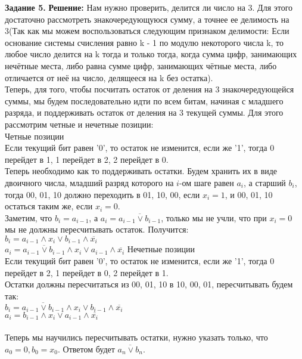 \documentclass[12pt,a4paper]{scrartcl}
\begin{document}
	\noindent
	\textbf{Задание 5.}
	\newline
	\textbf{Решение:}
	\newline
	\indent
	Нам нужно проверить, делится ли число на 3. Для этого достаточно рассмотреть знакочередующуюся сумму, а точнее ее делимость на 3(Так как мы можем воспользоваться следующим признаком делимости: Если основание системы счисления равно k - 1 по модулю некоторого числа k, то любое число делится на k тогда и только тогда, когда сумма цифр, занимающих нечётные места, либо равна сумме цифр, занимающих чётные места, либо отличается от неё на число, делящееся на k без остатка).\\
	Теперь, для того, чтобы посчитать остаток от деления на 3 знакочередующейся суммы, мы будем последовательно идти по всем битам, начиная с младшего разряда, и поддерживать остаток от деления на 3 текущей суммы. Для этого рассмотрим четные и нечетные позиции: \\
	\textbullet  Четные позиции \\
	\indent
		Если текущий бит равен '0', то остаток не изменится, если же '1', тогда 0 перейдет в 1, 1 перейдет в 2, 2 перейдет в 0. \\
		Теперь необходимо как то поддерживать остатки. Будем хранить их в виде двоичного числа, младший разряд которого на $i$-ом шаге равен $a_i$, а старший $b_i$, тогда 00, 01, 10 должно переходить в 01, 10, 00, если $x_i = 1$, и 00, 01, 10 остаться таким же, если $x_i = 0$.\\
		Заметим, что $b_i = a_{i - 1}$, а $a_i = \overline{a_{i - 1} \lor b_{i - 1}}$, только мы не учли, что при $x_i = 0$ мы не должны пересчитывать остаток. Получится:\\
		$b_i = a_{i - 1} \land x_i \lor b_{i - 1} \land \overline{x_i}$\\
		$a_i = \overline{a_{i - 1} \lor b_{i - 1}} \land x_i \lor a_{i - 1} \land \overline{x_i}$
	\newpage 
	\noindent
	\textbullet  Нечетные позиции \\
	\indent
	Если текущий бит равен '0', то остаток не изменится, если же '1', тогда 0 перейдет в 2, 1 перейдет в 0, 2 перейдет в 1. \\
	Остатки должны пересчитаться из 00, 01, 10 в 10, 00, 01, пересчитывать будем так: \\
	$b_i = \overline{a_{i - 1} \lor b_{i - 1}} \land x_i \lor b_{i - 1} \land \overline{x_i}$ \\
	$a_i = b_{i - 1} \land x_i \lor  a_{i - 1} \land \overline{x_i} $\\
	\\
	Теперь мы научились пересчитывать остатки, нужно указать только, что $a_0 = 0, b_0 = x_0$. Ответом будет $\overline{a_n \lor b_n}$.
\end{document}
